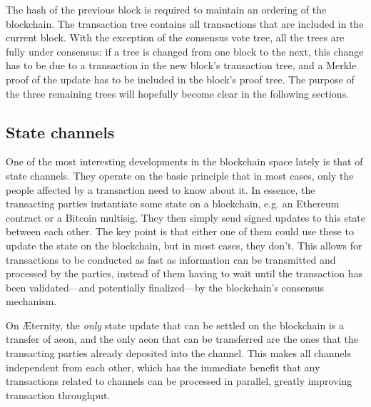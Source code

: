 \documentclass[a4paper, 10pt, conference]{ieeeconf}      %
\begin{document}
\begin{draft}
The hash of the previous block is required to maintain an ordering of the blockchain. The transaction tree contains all transactions that are included in the current block. With the exception of the consensus vote tree, all the trees are fully under consensus: if a tree is changed from one block to the next, this change has to be due to a transaction in the new block's transaction tree, and a Merkle proof of the update has to be included in the block's proof tree. The purpose of the three remaining trees will hopefully become clear in the following sections.



\subsection{State channels}
One of the most interesting developments in the blockchain space lately is that of state channels. They operate on the basic principle that in most cases, only the people affected by a transaction need to know about it. In essence, the transacting parties instantiate some state on a blockchain, e.g. an Ethereum contract or a Bitcoin multisig. They then simply send signed updates to this state between each other. The key point is that either one of them could use these to update the state on the blockchain, but in most cases, they don't. This allows for transactions to be conducted as fast as information can be transmitted and processed by the parties, instead of them having to wait until the transaction has been validated---and potentially finalized---by the blockchain's consensus mechanism.

On Æternity, the \emph{only} state update that can be settled on the blockchain is a transfer of aeon, and the only aeon that can be transferred are the ones that the transacting parties already deposited into the channel. This makes all channels independent from each other, which has the immediate benefit that any transactions related to channels can be processed in parallel, greatly improving transaction throughput.


\end{draft}
\end{document}
